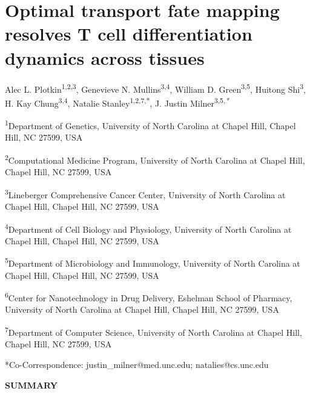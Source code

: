 \chapter{Optimal transport fate mapping resolves T cell differentiation
dynamics across tissues}

Alec L. Plotkin\textsuperscript{1,2,3}, Genevieve N.
Mullins\textsuperscript{3,4}, William D. Green\textsuperscript{3,5},
Huitong Shi\textsuperscript{3}, H. Kay Chung\textsuperscript{3,4},
Natalie Stanley\textsuperscript{1,2,7,*}, J. Justin
Milner\textsuperscript{3,5,\emph{*}}

\textsuperscript{1}Department of Genetics, University of North Carolina
at Chapel Hill, Chapel Hill, NC 27599, USA

\textsuperscript{2}Computational Medicine Program, University of North
Carolina at Chapel Hill, Chapel Hill, NC 27599, USA

\textsuperscript{3}Lineberger Comprehensive Cancer Center, University of
North Carolina at Chapel Hill, Chapel Hill, NC 27599, USA

\textsuperscript{4}Department of Cell Biology and Physiology, University
of North Carolina at Chapel Hill, Chapel Hill, NC 27599, USA

\textsuperscript{5}Department of Microbiology and Immunology, University
of North Carolina at Chapel Hill, Chapel Hill, NC 27599, USA

\textsuperscript{6}Center for Nanotechnology in Drug Delivery, Eshelman
School of Pharmacy, University of North Carolina at Chapel Hill, Chapel
Hill, NC 27599, USA

\textsuperscript{7}Department of Computer Science, University of North
Carolina at Chapel Hill, Chapel Hill, NC 27599, USA

*Co-Correspondence: justin\_milner@med.unc.edu; natalies@cs.unc.edu

\textbf{SUMMARY}

